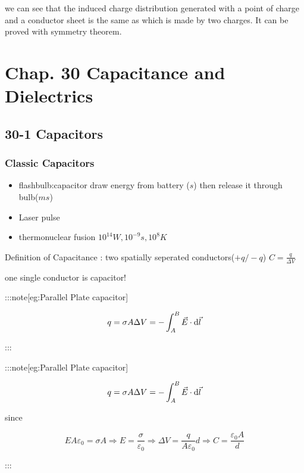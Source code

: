 \documentclass[
]{article}
\providecommand{\tightlist}{%
  \setlength{\itemsep}{0pt}\setlength{\parskip}{0pt}}
\begin{document}
we can see that the induced charge distribution generated with a point
of charge and a conductor sheet is the same as which is made by two
charges. It can be proved with symmetry theorem.

\hypertarget{chap.-30-capacitance-and-dielectrics}{%
\section{Chap. 30 Capacitance and
Dielectrics}\label{chap.-30-capacitance-and-dielectrics}}

\hypertarget{capacitors}{%
\subsection{30-1 Capacitors}\label{capacitors}}

\hypertarget{classic-capacitors}{%
\subsubsection{Classic Capacitors}\label{classic-capacitors}}

\begin{itemize}
\tightlist
\item
  flashbulb:capacitor draw energy from battery (\(s\)) then release it
  through bulb(\(ms\))
\item
  Laser pulse
\item
  thermonuclear fusion \(10^{14}W,10^{-9}s,10^8K\)
\end{itemize}

Definition of Capacitance : two spatially seperated
conductors(\(+q/-q\)) \(C=\frac{q}{\Delta V}\)

one single conductor is capacitor!

:::note{[}eg:Parallel Plate capacitor{]}

\[
q=\sigma A\\\Delta V=-\int _{A}^B \vec E\cdot \mathrm{d}\vec l
\]

:::

:::note{[}eg:Parallel Plate capacitor{]}

\[
q=\sigma A\\\Delta V=-\int _{A}^B \vec E\cdot \mathrm{d}\vec l
\]

since

\[
EA\varepsilon _0= \sigma A\Rightarrow E=\frac{\sigma}{\varepsilon _0}\Rightarrow \Delta V=\frac{q}{A\varepsilon_0}d\Rightarrow C=\frac{\varepsilon _0 A}{d}
\]

:::
\end{document}
